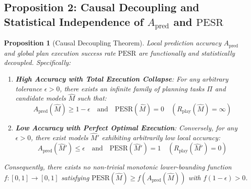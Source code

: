 \documentclass[11pt,a4paper]{article}
\newtheorem{proposition}[theorem]{Proposition}
\theoremstyle{definition}
\theoremstyle{remark}
\begin{document}
\subsection{Proposition 2: Causal Decoupling and Statistical Independence of \texorpdfstring{$A_{\text{pred}}$}{A_pred} and \texorpdfstring{$\text{PESR}$}{PESR}}

\begin{proposition}[Causal Decoupling Theorem]\label{prop:independence}
Local prediction accuracy $A_{\text{pred}}$ and global plan execution success rate $\text{PESR}$ are functionally and statistically decoupled. Specifically:
\begin{enumerate}
    \item \textbf{High Accuracy with Total Execution Collapse}: For any arbitrary tolerance $\epsilon > 0$, there exists an infinite family of planning tasks $\Pi$ and candidate models $\widehat{M}$ such that:
    \begin{equation}
        A_{\text{pred}}(\widehat{M}) \ge 1 - \epsilon \quad \text{and} \quad \text{PESR}(\widehat{M}) = 0 \quad (R_{\text{play}}(\widehat{M}) = \infty)
    \end{equation}
    \item \textbf{Low Accuracy with Perfect Optimal Execution}: Conversely, for any $\epsilon > 0$, there exist models $\widehat{M}'$ exhibiting arbitrarily low local accuracy:
    \begin{equation}
        A_{\text{pred}}(\widehat{M}') \le \epsilon \quad \text{and} \quad \text{PESR}(\widehat{M}') = 1 \quad (R_{\text{play}}(\widehat{M}') = 0)
    \end{equation}
\end{enumerate}
Consequently, there exists no non-trivial monotonic lower-bounding function $f: [0, 1] \to [0, 1]$ satisfying $\text{PESR}(\widehat{M}) \ge f(A_{\text{pred}}(\widehat{M}))$ with $f(1-\epsilon) > 0$.
\end{proposition}
\end{document}
